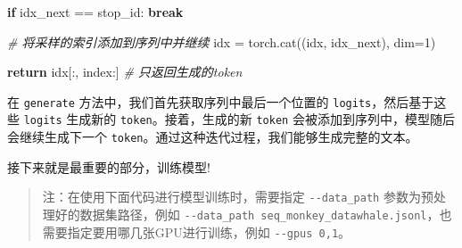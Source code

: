 \documentclass[
]{article}
\newenvironment{Shaded}{}{}
\newcommand{\CommentTok}[1]{\textcolor[rgb]{0.38,0.63,0.69}{\textit{#1}}}
\newcommand{\ControlFlowTok}[1]{\textcolor[rgb]{0.00,0.44,0.13}{\textbf{#1}}}
\newcommand{\DecValTok}[1]{\textcolor[rgb]{0.25,0.63,0.44}{#1}}
\newcommand{\NormalTok}[1]{#1}
\newcommand{\OperatorTok}[1]{\textcolor[rgb]{0.40,0.40,0.40}{#1}}
\begin{document}
\begin{Shaded}
\begin{Highlighting}[]
            \ControlFlowTok{if}\NormalTok{ idx\_next }\OperatorTok{==}\NormalTok{ stop\_id:}
                \ControlFlowTok{break}

            \CommentTok{\# 将采样的索引添加到序列中并继续}
\NormalTok{            idx }\OperatorTok{=}\NormalTok{ torch.cat((idx, idx\_next), dim}\OperatorTok{=}\DecValTok{1}\NormalTok{)}

        \ControlFlowTok{return}\NormalTok{ idx[:, index:] }\CommentTok{\# 只返回生成的token}
\end{Highlighting}
\end{Shaded}

在 \texttt{generate} 方法中，我们首先获取序列中最后一个位置的
\texttt{logits}，然后基于这些 \texttt{logits} 生成新的
\texttt{token}。接着，生成的新 \texttt{token}
会被添加到序列中，模型随后会继续生成下一个
\texttt{token}。通过这种迭代过程，我们能够生成完整的文本。

接下来就是最重要的部分，训练模型!

\begin{quote}
注：在使用下面代码进行模型训练时，需要指定 \texttt{-\/-data\_path}
参数为预处理好的数据集路径，例如
\texttt{-\/-data\_path\ seq\_monkey\_datawhale.jsonl}，也需要指定要用哪几张GPU进行训练，例如
\texttt{-\/-gpus\ 0,1}。
\end{quote}
\end{document}
